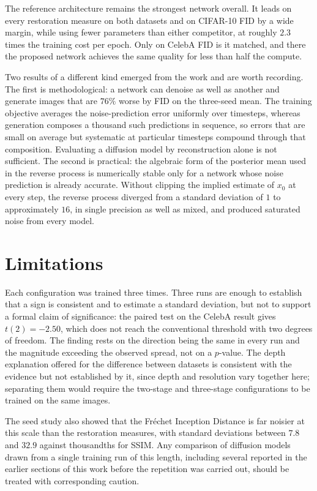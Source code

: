 The reference architecture remains the strongest network overall. It leads on every restoration
measure on both datasets and on CIFAR-10 FID by a wide margin, while using fewer parameters than
either competitor, at roughly $2.3$ times the training cost per epoch. Only on CelebA FID is it
matched, and there the proposed network achieves the same quality for less than half the compute.

Two results of a different kind emerged from the work and are worth recording. The first is
methodological: a network can denoise as well as another and generate images that are $76\%$ worse
by FID on the three-seed mean. The training objective averages the noise-prediction error uniformly
over timesteps, whereas generation composes a thousand such predictions in sequence, so errors that
are small on average but systematic at particular timesteps compound through that composition.
Evaluating a diffusion model by reconstruction alone is not sufficient. The second is practical: the
algebraic form of the posterior mean used in the reverse process is numerically stable only for a
network whose noise prediction is already accurate. Without clipping the implied estimate of $x_0$
at every step, the reverse process diverged from a standard deviation of $1$ to approximately $16$,
in single precision as well as mixed, and produced saturated noise from every model.

\section*{Limitations}

Each configuration was trained three times. Three runs are enough to establish that a sign is
consistent and to estimate a standard deviation, but not to support a formal claim of significance:
the paired test on the CelebA result gives $t(2) = -2.50$, which does not reach the conventional
threshold with two degrees of freedom. The finding rests on the direction being the same in every
run and the magnitude exceeding the observed spread, not on a $p$-value. The depth explanation
offered for the difference between datasets is consistent with the evidence but not established by
it, since depth and resolution vary together here; separating them would require the two-stage and
three-stage configurations to be trained on the same images.

The seed study also showed that the Fr\'echet Inception Distance is far noisier at this scale than
the restoration measures, with standard deviations between $7.8$ and $32.9$ against thousandths for
SSIM. Any comparison of diffusion models drawn from a single training run of this length, including
several reported in the earlier sections of this work before the repetition was carried out, should
be treated with corresponding caution.

